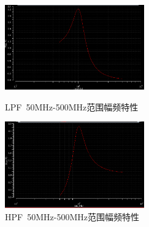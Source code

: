 \documentclass[12pt, a4paper]{article}
\begin{document}
    \begin{figure}[htbp]
    	\centering
    	\begin{minipage}[t]{0.48\textwidth}
    		\centering
    		\includegraphics[width=6cm]{L-LP-STD-plot-50-500}
    		\caption{LPF\ 50MHz-500MHz范围幅频特性}
    	\end{minipage}
    	\begin{minipage}[t]{0.48\textwidth}
    		\centering
    		\includegraphics[width=6cm]{L-HP-STD-plot-50-500}
    		\caption{HPF\ 50MHz-500MHz范围幅频特性}
    	\end{minipage}
    \end{figure}\par
\end{document}
